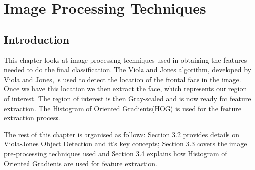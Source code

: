 \chapter{Image Processing Techniques} %
%


\section{Introduction} %
This chapter looks at image processing techniques used in obtaining the features needed to do the final classification. The Viola and Jones algorithm, developed by Viola and Jones, is used to detect the location of the frontal face in the image. Once we have this location we then extract the face, which represents our region of interest. The region of interest is then Gray-scaled and is now ready for feature extraction. The Histogram of Oriented Gradients(HOG) is used for the feature extraction process. 

The rest of this chapter is organised as follows: Section 3.2 provides details on Viola-Jones Object Detection and it's key concepts; Section 3.3 covers the image pre-processing techniques used and Section 3.4 explains how Histogram of Oriented Gradients are used for feature extraction.

